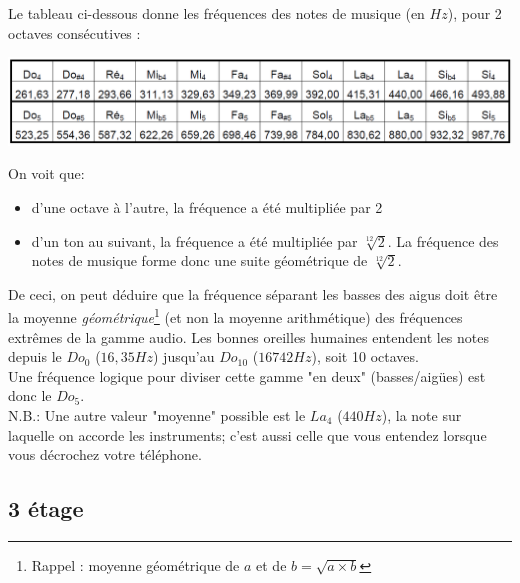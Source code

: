 Le tableau ci-dessous donne les fréquences des notes de musique (en $Hz$), pour 2 octaves consécutives :
\begin{center}
\includegraphics[scale=0.4]{notes.PNG}
\label{notes}
\end{center}

On voit que:
\begin{itemize}
\item d'une octave à l'autre, la fréquence a été multipliée par 2
\item d'un ton au suivant, la fréquence a été multipliée par $\sqrt[12]{2}$. La fréquence des notes de musique forme donc une suite géométrique de $\sqrt[12]{2}$.
\end{itemize}

De ceci, on peut déduire que la fréquence séparant les basses des aigus doit être la moyenne \emph{géométrique}\footnote{Rappel : moyenne géométrique de $a$ et de $b = \sqrt{a\times b}$} (et non la moyenne arithmétique) des fréquences extrêmes de la gamme audio. Les bonnes oreilles humaines entendent les notes depuis le $Do_0$ ($16,35Hz$) jusqu'au $Do_{10}$ ($16742Hz$), soit 10 octaves.\\
Une fréquence logique pour diviser cette gamme "en deux" (basses/aigües) est donc le $Do_5$.\\

N.B.: Une autre valeur "moyenne" possible est le $La_4$ ($440Hz$), la note sur laquelle on accorde les instruments; c'est aussi celle que vous entendez lorsque vous décrochez votre téléphone.

\subsection{3 étage}

